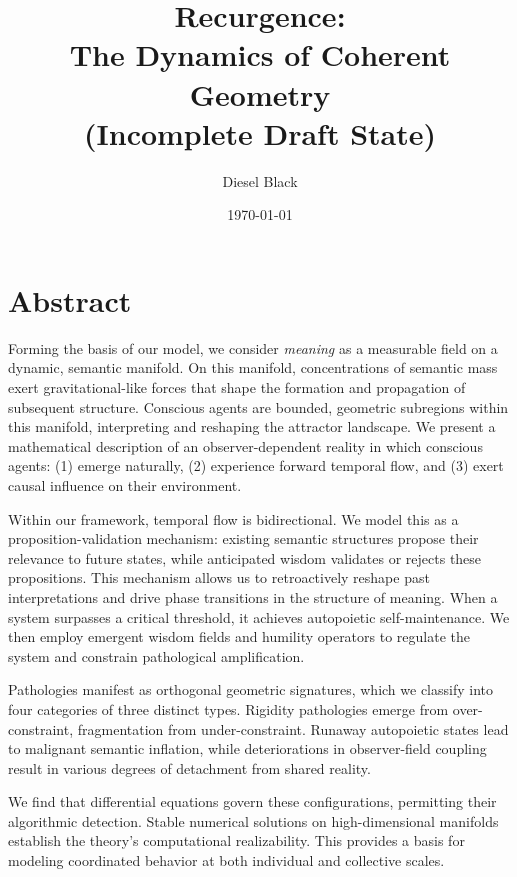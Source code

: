 \documentclass[11pt, a4paper]{report}
\title{{\Huge Recurgence}: \\ The Dynamics of Coherent Geometry \\ \vspace{1em} \small{(Incomplete Draft State)}}
\author{Diesel Black}
\date{\today}
\begin{document}

\maketitle

\section*{Abstract}

Forming the basis of our model, we consider \textit{meaning} as a measurable field on a dynamic, semantic manifold. On this manifold, concentrations of semantic mass exert gravitational-like forces that shape the formation and propagation of subsequent structure. Conscious agents are bounded, geometric subregions within this manifold, interpreting and reshaping the attractor landscape. We present a mathematical description of an observer-dependent reality in which conscious agents: (1) emerge naturally, (2) experience forward temporal flow, and (3) exert causal influence on their environment.

\vspace{1em}

Within our framework, temporal flow is bidirectional. We model this as a proposition-validation mechanism: existing semantic structures propose their relevance to future states, while anticipated wisdom validates or rejects these propositions. This mechanism allows us to retroactively reshape past interpretations and drive phase transitions in the structure of meaning. When a system surpasses a critical threshold, it achieves autopoietic self-maintenance. We then employ emergent wisdom fields and humility operators to regulate the system and constrain pathological amplification.

\vspace{1em}

Pathologies manifest as orthogonal geometric signatures, which we classify into four categories of three distinct types. Rigidity pathologies emerge from over-constraint, fragmentation from under-constraint. Runaway autopoietic states lead to malignant semantic inflation, while deteriorations in observer-field coupling result in various degrees of detachment from shared reality.

\vspace{1em}

We find that differential equations govern these configurations, permitting their algorithmic detection. Stable numerical solutions on high-dimensional manifolds establish the theory's computational realizability. This provides a basis for modeling coordinated behavior at both individual and collective scales.
\end{document}
